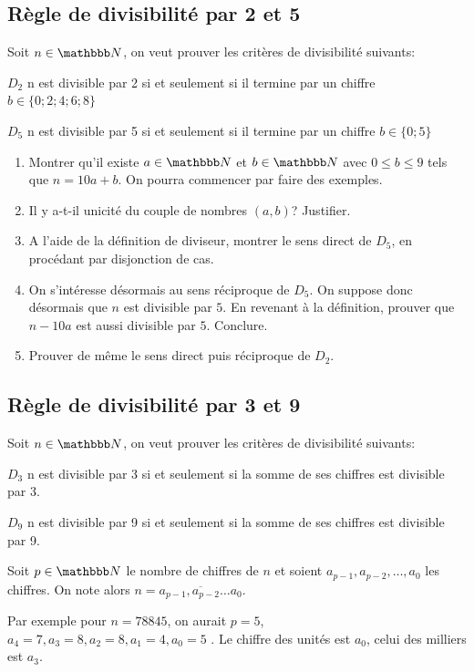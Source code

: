 \documentclass[a4paper,12pt, french, noSujetB]{article}
\date{Octobre 2026}
\begin{document}
\subsection*{Règle de divisibilité par 2 et 5}
Soit $n\in\N$, on veut prouver les critères de divisibilité suivants:

$D_2$ \og n est divisible par 2 si et seulement si il termine par un chiffre $b\in\{0;2;4;6;8\}$\fg{}

$D_5$ \og n est divisible par 5 si et seulement si il termine par un chiffre $b\in\{0;5\}$\fg{}

\begin{enumerate}
	\item Montrer qu'il existe $a\in\N$ et $b\in\N$ avec $0\le b \le 9$ tels que $n=10a+b$. On pourra commencer par faire des exemples.
	\item Il y a-t-il unicité du couple de nombres $(a,b)$? Justifier.
	\item A l'aide de la définition de diviseur, montrer le sens direct de $D_5$, en procédant par disjonction de cas.
	\item On s'intéresse désormais au sens réciproque de $D_5$. On suppose donc désormais que $n$ est divisible par $5$. En revenant à la définition, prouver que $n-10a$ est aussi divisible par $5$. Conclure.
	\item Prouver de même le sens direct puis réciproque de $D_2$.
\end{enumerate}

\vspace{-3mm}
\subsection*{Règle de divisibilité par 3 et 9}
Soit $n\in\N$, on veut prouver les critères de divisibilité suivants:

$D_3$ \og n est divisible par 3 si et seulement si la somme de ses chiffres est divisible par 3.

$D_9$ \og n est divisible par 9 si et seulement si la somme de ses chiffres est divisible par 9.

\medskip
Soit $p\in\N$ le nombre de chiffres de $n$ et soient $a_{p-1}, a_{p-2}, \dots, a_0$ les chiffres. On note alors $n=\overline{a_{p-1},  a_{p-2} \dots a_0}$.

Par exemple pour $n=78845$, on aurait $p=5$, $a_4=7, a_3=8, a_2=8, a_1=4, a_0=5$ . Le chiffre des unités est $a_0$, celui des milliers est $a_3$.
\end{document}
